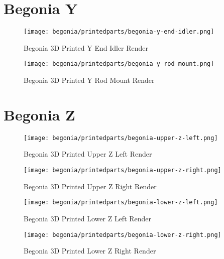 \section{Begonia Y}

\begin{figure}[H]
\centering
\texttt{[image: begonia/printedparts/begonia-y-end-idler.png]}
\caption{Begonia 3D Printed Y End Idler Render}
\label{fig:begyendidler}
\end{figure}

\begin{figure}[H]
\centering
\texttt{[image: begonia/printedparts/begonia-y-rod-mount.png]}
\caption{Begonia 3D Printed Y Rod Mount Render}
\label{fig:begyrodmount}
\end{figure}


\section{Begonia Z}

\begin{figure}[H]
\centering
\texttt{[image: begonia/printedparts/begonia-upper-z-left.png]}
\caption{Begonia 3D Printed Upper Z Left Render}
\label{fig:begupperzleft}
\end{figure}

\begin{figure}[H]
\centering
\texttt{[image: begonia/printedparts/begonia-upper-z-right.png]}
\caption{Begonia 3D Printed Upper Z Right Render}
\label{fig:begupperzright}
\end{figure}

\begin{figure}[H]
\centering
\texttt{[image: begonia/printedparts/begonia-lower-z-left.png]}
\caption{Begonia 3D Printed Lower Z Left Render}
\label{fig:beglowzleft}
\end{figure}

\begin{figure}[H]
\centering
\texttt{[image: begonia/printedparts/begonia-lower-z-right.png]}
\caption{Begonia 3D Printed Lower Z Right Render}
\label{fig:beglowzright}
\end{figure}


